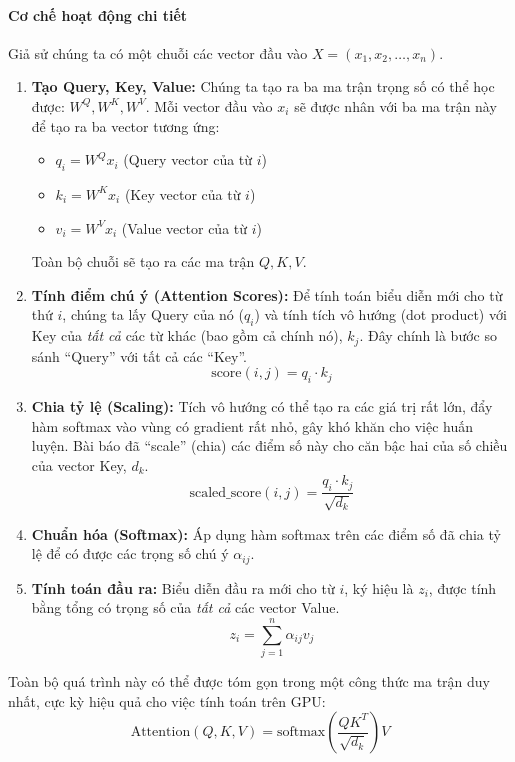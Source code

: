 \paragraph{Cơ chế hoạt động chi tiết}
Giả sử chúng ta có một chuỗi các vector đầu vào $X = (x_1, x_2, \dots, x_n)$.
\begin{enumerate}
    \item \textbf{Tạo Query, Key, Value:} Chúng ta tạo ra ba ma trận trọng số có thể học được: $W^Q, W^K, W^V$. Mỗi vector đầu vào $x_i$ sẽ được nhân với ba ma trận này để tạo ra ba vector tương ứng:
        \begin{itemize}
            \item $q_i = W^Q x_i$ (Query vector của từ $i$)
            \item $k_i = W^K x_i$ (Key vector của từ $i$)
            \item $v_i = W^V x_i$ (Value vector của từ $i$)
        \end{itemize}
        Toàn bộ chuỗi sẽ tạo ra các ma trận $Q, K, V$.
    \item \textbf{Tính điểm chú ý (Attention Scores):} Để tính toán biểu diễn mới cho từ thứ $i$, chúng ta lấy Query của nó ($q_i$) và tính tích vô hướng (dot product) với Key của \textit{tất cả} các từ khác (bao gồm cả chính nó), $k_j$. Đây chính là bước so sánh “Query” với tất cả các “Key”.
        $$ \text{score}(i, j) = q_i \cdot k_j $$
    \item \textbf{Chia tỷ lệ (Scaling):} Tích vô hướng có thể tạo ra các giá trị rất lớn, đẩy hàm softmax vào vùng có gradient rất nhỏ, gây khó khăn cho việc huấn luyện. Bài báo đã “scale” (chia) các điểm số này cho căn bậc hai của số chiều của vector Key, $d_k$.
        $$ \text{scaled\_score}(i, j) = \frac{q_i \cdot k_j}{\sqrt{d_k}} $$
    \item \textbf{Chuẩn hóa (Softmax):} Áp dụng hàm softmax trên các điểm số đã chia tỷ lệ để có được các trọng số chú ý $\alpha_{ij}$.
    \item \textbf{Tính toán đầu ra:} Biểu diễn đầu ra mới cho từ $i$, ký hiệu là $z_i$, được tính bằng tổng có trọng số của \textit{tất cả} các vector Value.
        $$ z_i = \sum_{j=1}^{n} \alpha_{ij} v_j $$
\end{enumerate}

Toàn bộ quá trình này có thể được tóm gọn trong một công thức ma trận duy nhất, cực kỳ hiệu quả cho việc tính toán trên GPU:
\begin{equation}
    \text{Attention}(Q, K, V) = \text{softmax}\left(\frac{QK^T}{\sqrt{d_k}}\right)V
    \label{eq:scaled_dot_product_attention}
\end{equation}

